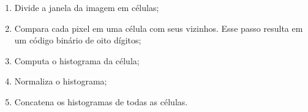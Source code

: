 \begin{description}
\begin{enumerate}
  \item Divide a janela da imagem em células;
  \item Compara cada pixel em uma célula com seus vizinhos. Esse passo resulta em um código binário de oito dígitos;
  \item Computa o histograma da célula;
  \item Normaliza o histograma;
  \item Concatena os histogramas de todas as células.
\end{enumerate}

\end{description}

%
%

